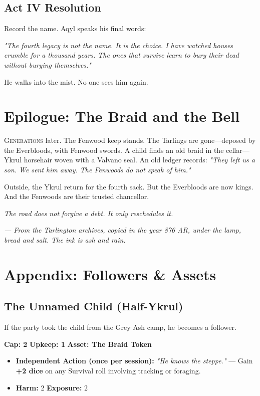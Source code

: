 \documentclass[11pt]{book}
\begin{document}
\section*{Act IV Resolution}
Record the name. Aqyl speaks his final words:

\emph{"The fourth legacy is not the name. It is the choice. I have watched houses crumble for a thousand years. The ones that survive learn to bury their dead without burying themselves."}

He walks into the mist. No one sees him again.

\clearpage

\chapter*{Epilogue: The Braid and the Bell}

\lettrine{G}{enerations} later. The Fenwood keep stands. The Tarlings are gone---deposed by the Everbloods, with Fenwood swords. A child finds an old braid in the cellar---Ykrul horsehair woven with a Valvano seal. An old ledger records: \textit{"They left us a son. We sent him away. The Fenwoods do not speak of him."}

Outside, the Ykrul return for the fourth sack. But the Everbloods are now kings. And the Fenwoods are their trusted chancellor.

\vspace{2em}
\noindent\textit{The road does not forgive a debt. It only reschedules it.}

\vspace{2em}
\noindent\textit{--- From the Tarlington archives, copied in the year 876 AR, under the lamp, bread and salt. The ink is ash and rain.}

\clearpage

\chapter*{Appendix: Followers & Assets}

\section*{The Unnamed Child (Half-Ykrul)}
If the party took the child from the Grey Ash camp, he becomes a follower.

\textbf{Cap: 2} \quad \textbf{Upkeep: 1} \quad \textbf{Asset: The Braid Token}
\begin{itemize}
    \item \textbf{Independent Action (once per session):} \textit{"He knows the steppe."} --- Gain \textbf{+2 dice} on any Survival roll involving tracking or foraging.
    \item \textbf{Harm:} 2 \quad \textbf{Exposure:} 2
\end{itemize}
\end{document}
